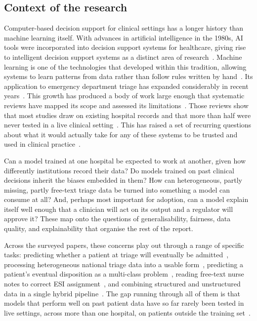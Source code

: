 \documentclass[11pt]{article}
\begin{document}
\subsection{Context of the research}

Computer-based decision support for clinical settings has a longer history than machine learning itself. With advances in artificial intelligence in the 1980s, AI tools were incorporated into decision support systems for healthcare, giving rise to intelligent decision support systems as a distinct area of research~\cite{Fernandes}. Machine learning is one of the technologies that developed within this tradition, allowing systems to learn patterns from data rather than follow rules written by hand~\cite{Fernandes}. Its application to emergency department triage has expanded considerably in recent years~\cite{Sanchez2022}. This growth has produced a body of work large enough that systematic reviews have mapped its scope and assessed its limitations~\cite{Sanchez2022, Fernandes}. Those reviews show that most studies draw on existing hospital records and that more than half were never tested in a live clinical setting~\cite{Fernandes}. This has raised a set of recurring questions about what it would actually take for any of these systems to be trusted and used in clinical practice~\cite{Sanchez2022, Fernandes}.

Can a model trained at one hospital be expected to work at another, given how differently institutions record their data? Do models trained on past clinical decisions inherit the biases embedded in them? How can heterogeneous, partly missing, partly free-text triage data be turned into something a model can consume at all? And, perhaps most important for adoption, can a model explain itself well enough that a clinician will act on its output and a regulator will approve it? These map onto the questions of generalisability, fairness, data quality, and explainability that organise the rest of the report.

Across the surveyed papers, these concerns play out through a range of specific tasks: predicting whether a patient at triage will eventually be admitted~\cite{Hong2018PredictingHA}, processing heterogeneous national triage data into a usable form~\cite{Vantu2023}, predicting a patient's eventual disposition as a multi-class problem~\cite{Yoshimura2026}, reading free-text nurse notes to correct ESI assignment~\cite{Ivanov2021}, and combining structured and unstructured data in a single hybrid pipeline~\cite{Wang2023}. The gap running through all of them is that models that perform well on past patient data have so far rarely been tested in live settings, across more than one hospital, on patients outside the training set~\cite{Fernandes, Sanchez2022}.
\end{document}
